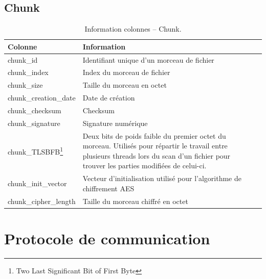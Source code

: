 \documentclass[a4paper,10pt, twoside]{report}
\begin{document}
\begin{spacing}{1.2}
\section{Chunk}
\begin{savenotes}
\begin{table}[h!]
  \centering
  \def\arraystretch{1.5}
  \setlength{\fboxsep}{13pt} %
  \setlength{\fboxrule}{0pt} %
  \begin{tabular}{lm{6cm}m{6cm}}
   \rowcolor{arkred} 
    \arrayrulecolor{gray73}\hline
    \color{white} \textbf{Colonne} & \color{white} \textbf{Information}\\
    \hline
    chunk\_id & Identifiant unique d'un morceau de fichier\\
    \hline
    chunk\_index & Index du morceau de fichier\\
    \hline
    chunk\_size & Taille du morceau en octet\\
    \hline
    chunk\_creation\_date & Date de création\\
    \hline
    chunk\_checksum & Checksum\\
    \hline
    chunk\_signature & Signature numérique\\
    \hline
    chunk\_TLSBFB\footnote{Two Last Significant Bit of First Byte} & Deux bits
    de poids faible du premier octet du morceau. Utilisés pour répartir le
    travail entre plusieurs threads lors du scan d'un fichier pour trouver les
    parties modifiées de celui-ci.\\
    \hline chunk\_init\_vector & Vecteur d'initialisation utilisé pour
    l'algorithme de chiffrement AES\\
    \hline
    chunk\_cipher\_length & Taille du morceau chiffré en octet\\
  \end{tabular}
  \caption{\label{tabDBRChunk} Information colonnes -- Chunk.}
\end{table}
\end{savenotes}


\chapter{Protocole de communication}
\thispagestyle{fancy}
\label{annProtocolComm}
\thispagestyle{fancy}


\end{spacing}
\end{document}
